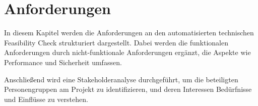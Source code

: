 \chapter{Anforderungen}\label{Chap:Anforderungen}

In diesem Kapitel werden die Anforderungen an den automatisierten technischen Feasibility Check strukturiert dargestellt. Dabei werden die funktionalen Anforderungen durch nicht-funktionale Anforderungen ergänzt, die Aspekte wie Performance und Sicherheit umfassen.

Anschließend wird eine Stakeholderanalyse durchgeführt, um die beteiligten Personengruppen am Projekt zu identifizieren, und deren Interessen Bedürfnisse und Einflüsse zu verstehen. 









